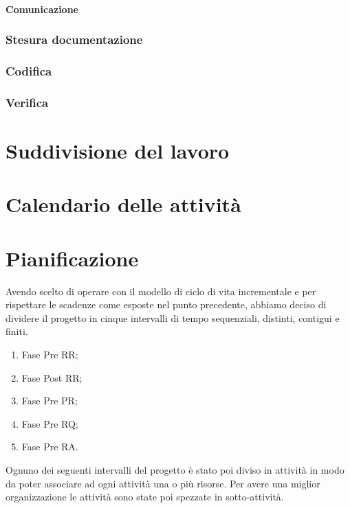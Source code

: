 \paragraph{Comunicazione}

\subsubsection{Stesura documentazione}
\subsubsection{Codifica}
\subsubsection{Verifica}


\newpage


\section{Suddivisione del lavoro}


\newpage


\section{Calendario delle attività}


\newpage


\section{Pianificazione}
\label{3.0}
Avendo scelto di operare con il modello di ciclo di vita incrementale e per rispettare le scadenze come esposte nel punto precedente, abbiamo deciso di dividere il progetto in cinque intervalli di tempo sequenziali, distinti, contigui e finiti.

\begin{enumerate}
\item Fase Pre RR;
\item Fase Post RR;
\item Fase Pre PR;
\item Fase Pre RQ;
\item Fase Pre RA.
\end{enumerate}

Ognuno dei seguenti intervalli del progetto è stato poi diviso in attività in modo da poter associare ad ogni attività una o più risorse. Per avere una miglior organizzazione le attività sono state poi spezzate in sotto-attività.

